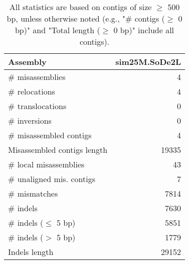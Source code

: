 \documentclass[12pt,a4paper]{article}
\begin{document}
\begin{table}[ht]
\begin{center}
\caption{All statistics are based on contigs of size $\geq$ 500 bp, unless otherwise noted (e.g., "\# contigs ($\geq$ 0 bp)" and "Total length ($\geq$ 0 bp)" include all contigs).}
\begin{tabular}{|l*{1}{|r}|}
\hline
Assembly & sim25M.SoDe2L \\ \hline
\# misassemblies & 4 \\ \hline
\hspace{5mm}\# relocations & 4 \\ \hline
\hspace{5mm}\# translocations & 0 \\ \hline
\hspace{5mm}\# inversions & 0 \\ \hline
\# misassembled contigs & 4 \\ \hline
Misassembled contigs length & 19335 \\ \hline
\# local misassemblies & 43 \\ \hline
\# unaligned mis. contigs & 7 \\ \hline
\# mismatches & 7814 \\ \hline
\# indels & 7630 \\ \hline
\hspace{5mm}\# indels ($\leq$ 5 bp) & 5851 \\ \hline
\hspace{5mm}\# indels ($>$ 5 bp) & 1779 \\ \hline
Indels length & 29152 \\ \hline
\end{tabular}
\end{center}
\end{table}
\end{document}
